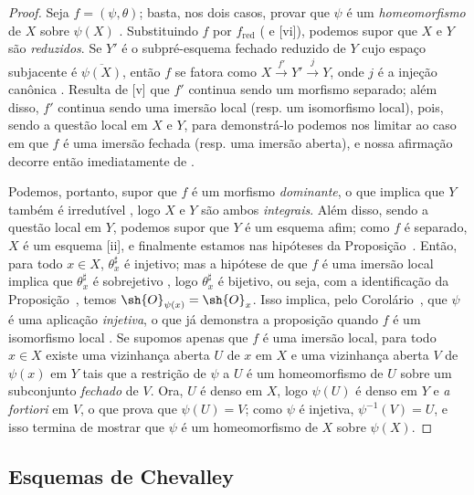 \documentclass[oneside]{amsart}
\newcommand{\oldpage}[2][]{{\marginnote{\normalfont\textbf{#1}~|~#2}}\ignorespaces}
\let\EGAOriginalLabel\label
\renewcommand{\label}[1]{\phantomsection\EGAOriginalLabel{#1}}
\begin{document}
\begin{proof}
Seja $f=(\psi,\theta)$;
basta, nos dois casos, provar que $\psi$ é um \emph{homeomorfismo} de $X$ sobre $\psi(X)$ .
Substituindo $f$ por $f_\text{red}$ ( e [vi]), podemos supor que $X$ e $Y$ são \emph{reduzidos}.
Se $Y'$ é o subpré-esquema fechado reduzido de $Y$ cujo espaço subjacente é $\overline{\psi(X)}$, então $f$ se fatora como $X\xrightarrow{f'}Y'\xrightarrow{j}Y$, onde $j$ é a injeção canônica .
Resulta de [v] que $f'$ continua sendo um morfismo separado; além disso, $f'$ continua sendo
\oldpage[I]{168}
uma imersão local (resp. um isomorfismo local), pois, sendo a questão local em $X$ e $Y$, para demonstrá-lo podemos nos limitar ao caso em que $f$ é uma imersão fechada (resp. uma imersão aberta), e nossa afirmação decorre então imediatamente de .

Podemos, portanto, supor que $f$ é um morfismo \emph{dominante}, o que implica que $Y$ também é irredutível , logo $X$ e $Y$ são ambos \emph{integrais}.
Além disso, sendo a questão local em $Y$, podemos supor que $Y$ é um esquema afim;
como $f$ é separado, $X$ é um esquema [ii], e finalmente estamos nas hipóteses da Proposição~.
Então, para todo $x\in X$, $\theta_x^\sharp$ é injetivo;
mas a hipótese de que $f$ é uma imersão local implica que $\theta_x^\sharp$ é sobrejetivo , logo $\theta_x^\sharp$ é bijetivo, ou seja, com a identificação da Proposição~, temos $\sh{O}_{\psi(x)}=\sh{O}_x$.
Isso implica, pelo Corolário~, que $\psi$ é uma aplicação \emph{injetiva}, o que já demonstra a proposição quando $f$ é um isomorfismo local .
Se supomos apenas que $f$ é uma imersão local, para todo $x\in X$ existe uma vizinhança aberta $U$ de $x$ em $X$ e uma vizinhança aberta $V$ de $\psi(x)$ em $Y$ tais que a restrição de $\psi$ a $U$ é um homeomorfismo de $U$ sobre um subconjunto \emph{fechado} de $V$.
Ora, $U$ é denso em $X$, logo $\psi(U)$ é denso em $Y$ e \emph{a fortiori} em $V$, o que prova que $\psi(U)=V$;
como $\psi$ é injetiva, $\psi^{-1}(V)=U$, e isso termina de mostrar que $\psi$ é um homeomorfismo de $X$ sobre $\psi(X)$.
\end{proof}

\subsection{Esquemas de Chevalley}
\label{subsection:I.8.3}
\end{document}
